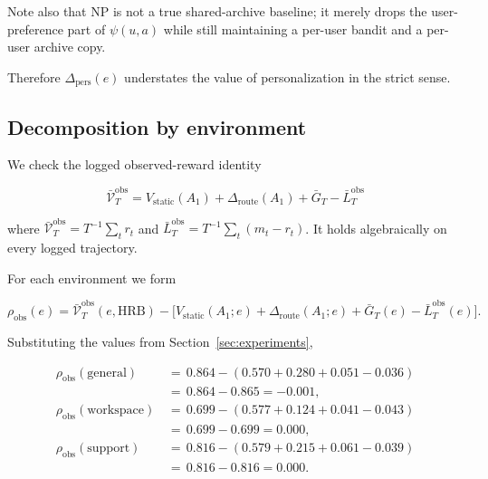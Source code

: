 \documentclass{article} %
\begin{document}
Note also that NP is not a true shared-archive baseline; it merely drops the user-preference part of $\psi(u,a)$ while still maintaining a per-user bandit and a per-user archive copy.

Therefore $\Delta_{\mathrm{pers}}(e)$ understates the value of personalization in the strict sense.

\subsection{Decomposition by environment}

\label{app:decomp-reconcile}

We check the logged observed-reward identity

\begin{equation}
\label{eq:app-identity-recall}
\bar{\mathcal{V}}_T^{\mathrm{obs}}
= V_{\mathrm{static}}(A_1)
+ \Delta_{\mathrm{route}}(A_1)
+ \bar{G}_T
- \bar{L}_T^{\mathrm{obs}}
\end{equation}

where
\(\bar{\mathcal V}_T^{\mathrm{obs}}=T^{-1}\sum_t r_t\) and
\(\bar L_T^{\mathrm{obs}}=T^{-1}\sum_t(m_t-r_t)\). It holds algebraically on
every logged trajectory.

For each environment we form

\begin{equation}
\label{eq:app-residual}
\rho_{\mathrm{obs}}(e)
= \bar{\mathcal{V}}_T^{\mathrm{obs}}(e,\mathrm{HRB})
- \big[V_{\mathrm{static}}(A_1;e)
+ \Delta_{\mathrm{route}}(A_1;e)
+ \bar{G}_T(e)
- \bar{L}_T^{\mathrm{obs}}(e)\big].
\end{equation}

Substituting the values from Section~\ref{sec:experiments},

\begin{equation}
\label{eq:app-residual-num}
\begin{aligned}
\rho_{\mathrm{obs}}(\mathrm{general})  &\,=\, 0.864 - (0.570 + 0.280 + 0.051 - 0.036)\\
                        &\,=\, 0.864 - 0.865 = -0.001,\\
\rho_{\mathrm{obs}}(\mathrm{workspace})&\,=\, 0.699 - (0.577 + 0.124 + 0.041 - 0.043)\\
                        &\,=\, 0.699 - 0.699 = 0.000,\\
\rho_{\mathrm{obs}}(\mathrm{support})  &\,=\, 0.816 - (0.579 + 0.215 + 0.061 - 0.039)\\
                        &\,=\, 0.816 - 0.816 = 0.000.
\end{aligned}
\end{equation}
\end{document}
